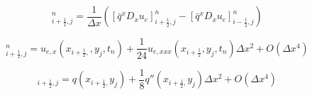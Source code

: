 \documentclass[twoside]{article}
\begin{document}
\begin{equation}
[D_{x}\bar{q}^{x}D_{x}u_{e}]_{i+\frac{1}{2},j}^{n}=\frac{1}{\Delta x}\left([\bar{q}^{x}D_{x}u_{e}]_{i+\frac{1}{2},j}^{n}-[\bar{q}^{x}D_{x}u_{e}]_{i-\frac{1}{2},j}^{n}\right)
\end{equation}


\begin{equation}
[D_{x}u_{e}]_{i+\frac{1}{2},j}^{n}=u_{e,x}(x_{i+\frac{1}{2},},y_{j},t_{n})+\frac{1}{24}u_{e,xxx}(x_{i+\frac{1}{2}},y_{j},t_{n})\Delta x^{2}+O(\Delta x^{4})
\end{equation}


\begin{equation}
[\bar{q}^{x}]_{i+\frac{1}{2},j}=q(x_{i+\frac{1}{2},}y_{j})+\frac{1}{8}q''(x_{i+\frac{1}{2},}y_{j})\Delta x^{2}+O(\Delta x^{4})
\end{equation}
\end{document}
